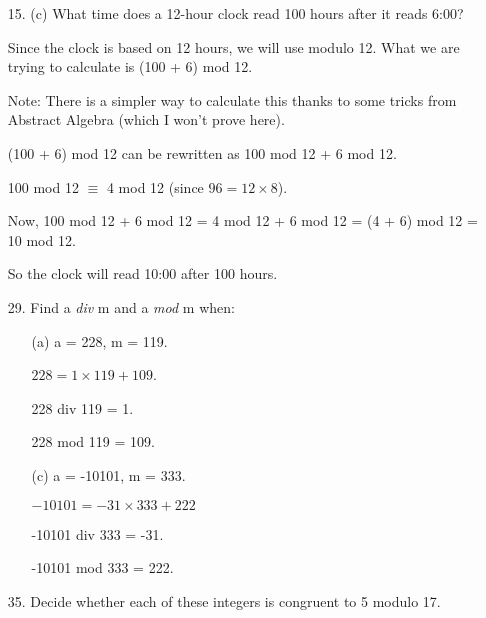 \documentclass[12pt]{article}
\newcommand\bufsub{\vspace{1.0in}}
\newenvironment{answer}{\larger[2]}{}
\begin{document}
\begin{enumerate}

\item[15. (c)] What time does a 12-hour clock read 100 hours after it reads 6:00?

\begin{answer}
    Since the clock is based on 12 hours, we will use modulo 12. What we are trying to calculate is (100 + 6) mod 12. 
    
    Note: There is a simpler way to calculate this thanks to some tricks from Abstract Algebra (which I won't prove here). 

    (100 + 6) mod 12 can be rewritten as 100 mod 12 + 6 mod 12.

    100 mod 12 $\equiv$ 4 mod 12 (since $96 = 12 \times 8$). 

    Now, 100 mod 12 + 6 mod 12 = 4 mod 12 + 6 mod 12 = (4 + 6) mod 12 = 10 mod 12. 
    
    So the clock will read 10:00 after 100 hours.
\end{answer}
\bufsub 


\item[29.] Find a \emph{div} m and a \emph{mod} m when:

\begin{enumerate}
    \item[(a)] a = 228, m = 119.
    
    \begin{answer}
        $228 = 1 \times 119 + 109$.

        228 div 119 = 1.

        228 mod 119 = 109.
    \end{answer}
    
    \item[(c)] a = -10101, m = 333.
    
    \begin{answer}
        $-10101 = -31 \times 333 + 222$

        -10101 div 333 = -31.

        -10101 mod 333 = 222.
    \end{answer}
    
\end{enumerate}
\bufsub


\item[35.] Decide whether each of these integers is congruent to 5 modulo 17.


\end{enumerate}
\end{document}
